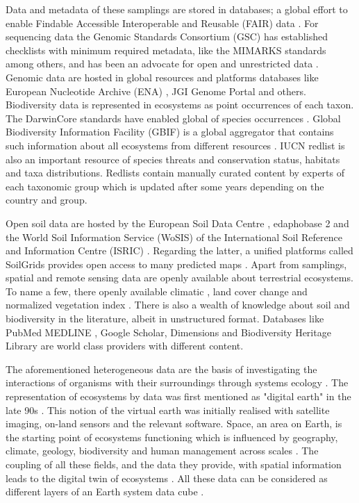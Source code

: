 \documentclass[a4paper,12pt]{article}
\begin{document}
Data and metadata of these samplings are stored in databases;
a global effort to enable Findable Accessible Interoperable and Reusable (FAIR) data \parencite{Wilkinson2016}.
For sequencing data the Genomic Standards
Consortium (GSC) \parencite{Field2011} has established checklists with minimum required metadata, like the MIMARKS \parencite{yilmaz2011minimum}
standards among others, and has been an advocate for open and unrestricted data \parencite{Amann2019}.
Genomic data are hosted in global resources and platforms databases like European Nucleotide Archive (ENA) \parencite{ocathail2024the-european},
JGI Genome Portal \parencite{nordbergGenomePortalDepartment2014a} and others.
Biodiversity data is represented in ecosystems as point occurrences of each taxon. The
DarwinCore standards have enabled global of species occurrences \parencite{Wieczorek2012}.
Global Biodiversity Information Facility (GBIF) is a global aggregator that contains such information about all ecosystems from 
different resources \parencite{noauthor_gbif_nodate}. 
IUCN redlist \parencite{iucn2024} is also an important resource of species 
threats and conservation status, habitats and taxa distributions. Redlists contain 
manually curated content by experts of each taxonomic group which is updated
after some years depending on the country and group.

Open soil data are hosted by the 
European Soil Data Centre \parencite{panagos2022european}, edaphobase 2 \parencite{russell2024edaphobase}
and the World Soil Information Service (WoSIS) of the International Soil Reference and Information Centre (ISRIC) \parencite{Batjes2024}.
Regarding the latter, a unified
platforms called SoilGrids provides open access to many predicted maps \parencite{poggio-soil-7-217-2021}.
Apart from samplings,
spatial and remote sensing data are openly available about terrestrial ecosystems.
To name a few, there openly available climatic \parencite{Fick2017}, land cover change \parencite{winkler2021global} and normalized
vegetation index \parencite{CopernicusNDVI2021}.
There is also a wealth of knowledge about soil and biodiversity in the literature,
albeit in unstructured format. 
Databases like PubMed MEDLINE \parencite{sayers2024database}, Google Scholar, Dimensions and Biodiversity Heritage Library 
are world class providers with different content.

The aforementioned heterogeneous data are the basis of investigating the
interactions of organisms with their surroundings through systems ecology \parencite{van-dyne1966ecosystems}.
The representation of ecosystems by data was first mentioned as "digital earth" in the late 90s \parencite{Goodchild_2012}.
This notion of the virtual earth was initially realised with satellite imaging,
on-land sensors and the relevant software. Space, an area on Earth, is
the starting point of ecosystems functioning which is influenced by geography,
climate, geology, biodiversity and human management across scales \parencite{Zarnetske2019_towards}.
The coupling of all these
fields, and the data they provide, with spatial information leads to the
digital twin of ecosystems \parencite{Voosen2020DigitalTwinEarth}. All these data can be considered as different layers
of an Earth system data cube \parencite{mahecha2020earth}.
\end{document}

